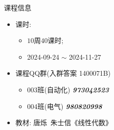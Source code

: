 \begin{frame}[<*>]{课程信息}
\begin{itemize}
	\item 课时:
		\begin{itemize}
			\item $10$周$40$课时;
			\item 2024-09-24 $\sim$ 2024-11-27
		\end{itemize}
	\item 课程QQ群(入群答案 1400071B)
		\begin{itemize}
			\item 003班(自动化) \emph{\textbf{973042523}}
			\item 004班(电气) \emph{\textbf{980820998}}
		\end{itemize}
	\item 教材: 唐烁\ 朱士信《线性代数》
\end{itemize}
\end{frame}





